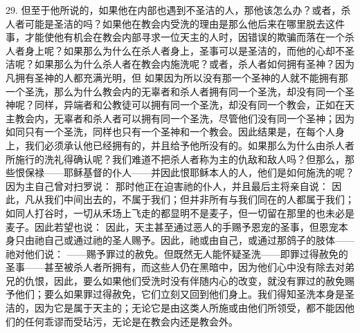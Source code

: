 29. 但至于他所说的，如果他在内部也遇到不圣洁的人，那他该怎么办？或者，杀人者可能是圣洁的吗？如果他在教会内受洗的理由是那么他后来在哪里脱去这件事，才能使他有机会在教会内部寻求一位天主的人时，因错误的欺骗而落在一个杀人者身上呢？如果那么为什么在杀人者身上，圣事可以是圣洁的，而他的心却不圣洁呢？如果那么为什么杀人者在教会内施洗呢？或者，杀人者如何拥有圣神？因为凡拥有圣神的人都充满光明，但  如果因为所以没有那一个圣神的人就不能拥有那一个圣洗，那么为什么教会内的无辜者和杀人者拥有同一个圣洗，却没有同一个圣神呢？同样，异端者和公教徒可以拥有同一个圣洗，却没有同一个教会，正如在天主教会内，无辜者和杀人者可以拥有同一个圣洗，尽管他们没有同一个圣神；因为如同只有一个圣洗，同样也只有一个圣神和一个教会。因此结果是，在每个人身上，我们必须承认他已经拥有的，并且给予他所没有的。如果那么为什么由杀人者所施行的洗礼得确认呢？我们难道不把杀人者称为主的仇敌和敌人吗？但那么，那些恨保禄——耶稣基督的仆人——并因此恨耶稣本人的人，他们是如何施洗的呢？因为主自己曾对扫罗说：  那时他正在迫害祂的仆人，并且最后主将亲自说：  因此，凡从我们中间出去的，不属于我们；但并非所有与我们同在的人都属于我们；如同人打谷时，一切从禾场上飞走的都显明不是麦子，但一切留在那里的也未必是麦子。因此若望也说：  因此，天主甚至通过恶人的手赐予恩宠的圣事，但恩宠本身只由祂自己或通过祂的圣人赐予。因此，祂或由自己，或通过那鸽子的肢体——祂对他们说：  ——赐予罪过的赦免。但既然无人能怀疑圣洗——即罪过得赦免的圣事——甚至被杀人者所拥有，而这些人仍在黑暗中，因为他们心中没有除去对弟兄的仇恨，因此，要么如果他们受洗时没有伴随内心的改变，就没有罪过的赦免赐予他们；要么如果罪过得赦免，它们立刻又回到他们身上。我们得知圣洗本身是圣洁的，因为它是属于天主的；无论它是由这类人所施或由他们所领受，都不能因他们的任何乖谬而受玷污，无论是在教会内还是教会外。\par


